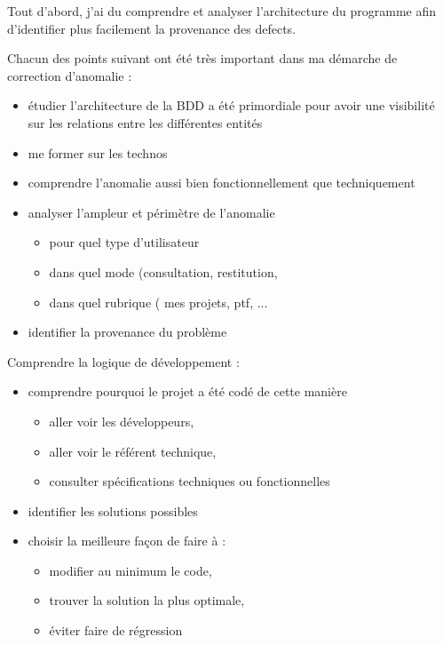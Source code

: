 Tout d'abord, j'ai du comprendre et analyser l'architecture du programme afin d'identifier plus facilement la provenance des defects. 

Chacun des points suivant ont été très important dans ma démarche de correction d'anomalie :
\begin{itemize}
    \item étudier l'architecture de la BDD a été primordiale pour avoir une visibilité sur les relations entre les différentes entités 
    \item me former sur les technos
    \item comprendre l'anomalie aussi bien fonctionnellement que techniquement
    \item analyser l'ampleur et périmètre de l'anomalie
    \begin{itemize}
        \item pour quel type d'utilisateur 
        \item dans quel mode (consultation, restitution, 
        \item dans quel rubrique ( mes projets, ptf, ...
    \end{itemize}
    \item identifier la provenance du problème

\end{itemize}

Comprendre la logique de développement :
\begin{itemize}
    \item comprendre pourquoi le projet a été codé de cette manière
    \begin{itemize}
        \item aller voir les développeurs, 
        \item aller voir le référent technique,
        \item consulter spécifications techniques ou fonctionnelles
    \end{itemize}
    \item identifier les solutions possibles
    \item choisir la meilleure façon de faire à :
    \begin{itemize}
        \item modifier au minimum le code,
        \item trouver la solution la plus optimale,
        \item éviter faire de régression 
    \end{itemize}
 \end{itemize}              
            
